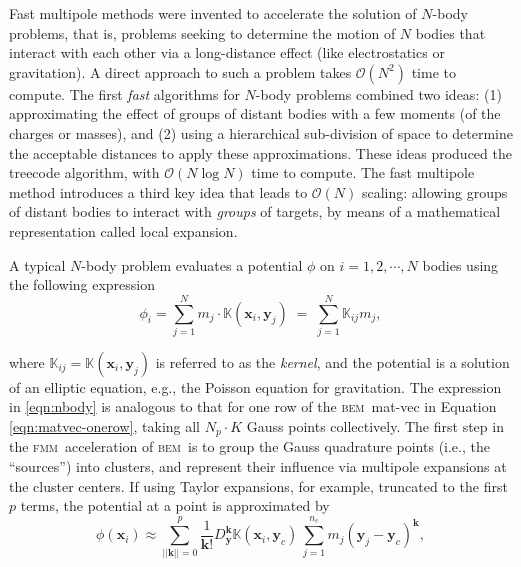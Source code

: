 \documentclass[smallcondensed,final]{svjour3}
\newcommand{\K}{\mathbb{K}}
\newcommand{\bem}{\textsc{bem}\xspace}
\newcommand{\fmm}{\textsc{fmm}\xspace}
\newcommand{\bigO}{\mathcal{O}}
\renewcommand{\O}[1]{\mathcal{O}(#1)}
\newcommand{\vect}[1]{\mathbf{#1}}
\begin{document}
Fast multipole methods were invented to accelerate the solution of $N$-body problems, that is, problems seeking to determine the motion of $N$ bodies that interact with each other via a long-distance effect (like electrostatics or gravitation). A direct approach to such a problem takes $\O{N^{2}}$ time to compute. The first \emph{fast} algorithms for $N$-body problems \cite{Appel1985,BarnesHut1986} combined two ideas: (1) approximating the effect of groups of distant bodies with a few moments (of the charges or masses), and (2) using a hierarchical sub-division of space to determine the acceptable distances to apply these approximations.
 These ideas produced the treecode algorithm, with $\bigO(N\log N)$ time to compute.
The fast multipole method \cite{GreengardRokhlin1987} introduces a third key idea that leads to $\bigO(N)$ scaling: allowing groups of distant bodies to interact with \emph{groups} of targets, by means of a mathematical representation called local expansion.

A typical $N$-body problem evaluates a potential $\phi$ on $i=1, 2, \cdots, N$ bodies
using the following expression
%
\begin{equation}\label{eqn:nbody}
	\phi_{i} = \sum_{j=1}^{N} m_{j}\cdot\K(\vect{x}_{i},\vect{y}_{j}) \; = \; \sum_{j=1}^{N}\K_{ij}m_{j},
\end{equation}

\noindent where $\K_{ij} = \K(\vect{x}_{i},\vect{y}_{j})$ is referred to as the \emph{kernel}, and the potential is a solution of an elliptic equation, e.g., the Poisson equation for gravitation. The expression in \eqref{eqn:nbody} is analogous to that for one row of the \bem\ mat-vec in Equation \eqref{eqn:matvec-onerow}, taking all $N_p \cdot K$ Gauss points collectively.
The first step in the \fmm\ acceleration of \bem\ is to group the Gauss quadrature points (i.e., the ``sources'') into clusters, and represent their influence via multipole expansions at the cluster centers. If using Taylor expansions, for example, truncated to the first $p$ terms, the potential at a point is approximated by
%
\begin{equation}
	\phi(\vect{x}_i) \approx \sum_{||\vect{k}||=0}^{p}\frac{1}{\vect{k}!}D^{\vect{k}}_{\vect{y}} \K(\vect{x}_i,\vect{y}_c)\, \sum_{j=1}^{n_c} m_j (\vect{y}_j-\vect{y}_c)^{\vect{k}},
	\label{eqn:cartesian_multipole}
\end{equation}
\end{document}
